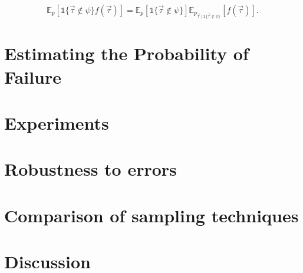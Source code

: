 \begin{equation}
    \mathbb{E}_p \left[ \mathds{1} \{\vec{\tau} \not \in \psi\} f(\vec{\tau}) \right] = \mathbb{E}_p \left[ \mathds{1} \{\vec{\tau} \not \in \psi\} \right] \mathbb{E}_{p_{\vec{\tau} \mid \mathds{1} \{\vec{\tau} \not \in \psi\}}}  \left[ f(\vec{\tau}) \right] \text{.}
\end{equation}



\section{Estimating the Probability of Failure}



\section{Experiments}

\section{Robustness to errors}

\section{Comparison of sampling techniques}

\section{Discussion}